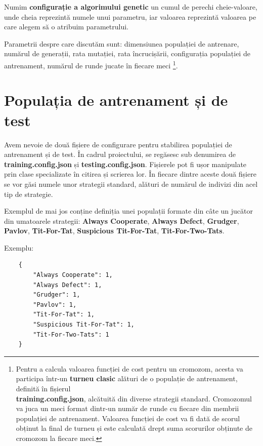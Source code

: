 Numim \textbf{configurație a algorimului genetic} un cumul de perechi cheie-valoare, unde cheia reprezintă numele unui parametru, iar valoarea reprezintă valoarea pe care alegem să o atribuim parametrului.

Parametrii despre care discutăm sunt: dimensiunea populației de antrenare, numărul de generații, rata mutației, rata încrucișării, configurația populației de antrenament, numărul de runde jucate în fiecare meci \footnote{Pentru a calcula valoarea funcției de cost pentru un cromozom, acesta va participa într-un \textbf{turneu clasic} alături de o populație de antrenament, definită în fișierul\\ \textbf{training.config.json}, alcătuită din diverse strategii standard. Cromozomul va juca un meci format dintr-un număr de runde cu fiecare din membrii populației de antrenament. Valoarea funcției de cost va fi dată de scorul obținut la final de turneu și este calculată drept suma scorurilor obținute de cromozom la fiecare meci.}.  

\section{Populația de antrenament și de test}

Avem nevoie de două fișiere de configurare pentru stabilirea populației de antrenament și de test. În cadrul proiectului, se regăsesc sub denumirea de \textbf{training.config.json} și \textbf{testing.config.json}. Fișierele pot fi ușor manipulate prin clase specializate în citirea și scrierea lor. În fiecare dintre aceste două fișiere se vor găsi numele unor strategii standard, alături de numărul de indivizi din acel tip de strategie. 

Exemplul de mai jos conține definiția unei populații formate din câte un jucător din umatoarele strategii: \textbf{Always Cooperate}, \textbf{Always Defect}, \textbf{Grudger}, \textbf{Pavlov}, \textbf{Tit-For-Tat}, \textbf{Suspicious Tit-For-Tat}, \textbf{Tit-For-Two-Tats}.

\clearpage

Exemplu: 

\begin{lstlisting}
	{
		"Always Cooperate": 1,
		"Always Defect": 1,
		"Grudger": 1,
		"Pavlov": 1,
		"Tit-For-Tat": 1,
		"Suspicious Tit-For-Tat": 1,
		"Tit-For-Two-Tats": 1
	}
\end{lstlisting}

